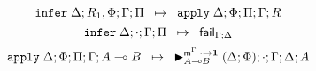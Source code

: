 \[
\mathtt{infer} \; \Delta; R_1, \Phi; \Gamma; \Pi \;\; \mapsto \;\; \mathtt{apply} \; \Delta; \Phi; \Pi; \Gamma; R
\]
\[
\mathtt{infer} \; \Delta; \cdot; \Gamma; \Pi \;\; \mapsto \;\; \mathsf{fail}_{\Gamma; \Delta}
\]
\[
\mathtt{apply} \; \Delta; \Phi; \Pi; \Gamma; A \multimap B \;\; \mapsto \;\; {\blacktriangleright}_{A \multimap B}^{\mathsf{m}^\Gamma \; \cdot \rightarrow
                                                            \mathbf{1}} \; (\Delta; \Phi); \cdot; \Gamma; \Delta; A
\]
